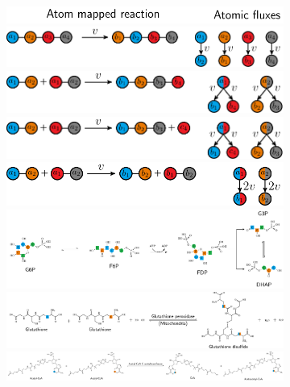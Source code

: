 \documentclass{standalone}
\begin{document}
\begin{figure}
     \begin{subfigure}[t]{1.0\textwidth}
        \includegraphics[]{header.pdf}
        \vspace*{-1.0ex}
        \caption{}
        \includegraphics[]{case-1.pdf}
        \caption{}
        \includegraphics[]{case-2.pdf}
        \caption{}
        \includegraphics[]{case-3.pdf}
        \caption{}
        \includegraphics[]{case-4.pdf}
        \caption{}
        \includegraphics[width=12.0cm]{case-1-bio-example.pdf}
        \caption{}
        \includegraphics[width=12.0cm]{case-2-bio-example-inkscape.pdf}
        \caption{}
        \includegraphics[width=12.0cm]{case-3-bio-example-inkscape.pdf}

    \end{subfigure}
\end{figure}
\end{document}
